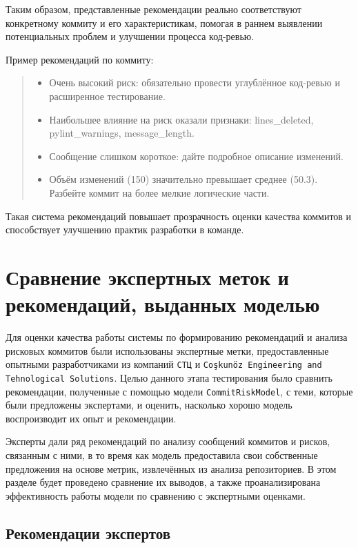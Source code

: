 Таким образом, представленные рекомендации реально соответствуют конкретному коммиту и его характеристикам, помогая в раннем выявлении потенциальных проблем и улучшении процесса код-ревью.

\vspace{0.5em}
Пример рекомендаций по коммиту:

\begin{quote}
	\begin{itemize}
		\item Очень высокий риск: обязательно провести углублённое код-ревью и расширенное тестирование.
		\item  Наибольшее влияние на риск оказали признаки: lines\_deleted, pylint\_warnings, message\_length.
		\item  Сообщение слишком короткое: дайте подробное описание изменений.
		\item Объём изменений (150) значительно превышает среднее (50.3). Разбейте коммит на более мелкие логические части.
	\end{itemize}
\end{quote}

Такая система рекомендаций повышает прозрачность оценки качества коммитов и способствует улучшению практик разработки в команде.

\section{Сравнение экспертных меток и рекомендаций, выданных моделью}

Для оценки качества работы системы по формированию рекомендаций и анализа рисковых коммитов были использованы экспертные метки, предоставленные опытными разработчиками из компаний \texttt{СТЦ} и \texttt{Coşkunöz Engineering and Tehnological Solutions}. Целью данного этапа тестирования было сравнить рекомендации, полученные с помощью модели \texttt{CommitRiskModel}, с теми, которые были предложены экспертами, и оценить, насколько хорошо модель воспроизводит их опыт и рекомендации.

Эксперты дали ряд рекомендаций по анализу сообщений коммитов и рисков, связанным с ними, в то время как модель предоставила свои собственные предложения на основе метрик, извлечённых из анализа репозиториев. В этом разделе будет проведено сравнение их выводов, а также проанализирована эффективность работы модели по сравнению с экспертными оценками.

\subsection{Рекомендации экспертов}

